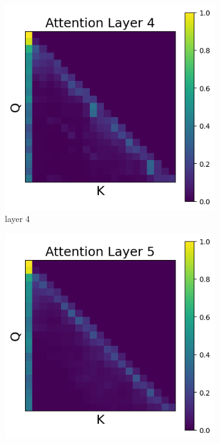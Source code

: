 \documentclass[11pt]{article}
\begin{document}
\begin{figure}[t]
  \begin{subfigure}[t]{0.24\textwidth}
    \centering
    \includegraphics[width=1.4\columnwidth]{figures/intervention5/layer_4.png}
    \caption{layer 4}
    \label{fig:obs2_layer4}
  \end{subfigure}\hfill
  \begin{subfigure}[t]{0.24\textwidth}
    \centering
    \includegraphics[width=1.4\columnwidth]{figures/intervention5/layer_5.png}

\end{subfigure}
\end{figure}
\end{document}
